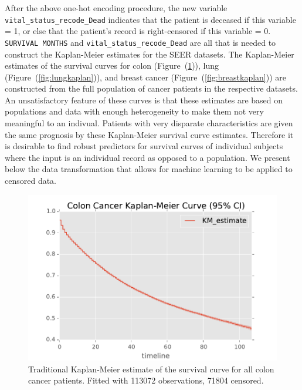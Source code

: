 \documentclass[10pt,letterpaper]{article}
\newcommand{\codewhite}[1]{\colorbox{white}{\texttt{#1}}}
\begin{document}
After the above one-hot encoding procedure, the new variable
\codewhite{vital\_status\_recode\_Dead} indicates that the patient is deceased if this variable = 1, or else that the patient's record is right-censored if this variable = 0.
\codewhite{SURVIVAL MONTHS} and \codewhite{vital\_status\_recode\_Dead} are all that is needed to construct the Kaplan-Meier estimates for the SEER datasets.
The Kaplan-Meier estimates of the survival curves for colon (Figure~(\ref{fig:colonkaplan})), lung 
(Figure~(\ref{fig:lungkaplan})), and breast cancer (Figure~(\ref{fig:breastkaplan})) are constructed from the full population of cancer patients in the respective datasets.
An unsatisfactory feature of these curves is that these estimates are based on populations and data with enough heterogeneity to make them not very meaningful to an indivual. Patients with very disparate characteristics are given the same prognosis by these Kaplan-Meier survival curve estimates. Therefore it is desirable to find robust predictors for survival curves of individual subjects where the input is an individual record as opposed to a population. We present below the data transformation that allows for machine learning to be applied to censored data.



\begin{figure}[tbp]
\centering 
\begin{center}
\includegraphics[width=.90\textwidth,origin=c]{colonkaplan.pdf}
\caption{\label{fig:colonkaplan} Traditional Kaplan-Meier estimate of the survival curve for all colon cancer patients. Fitted with 113072 observations, 71804 censored.}
\end{center}
\end{figure}
\end{document}
